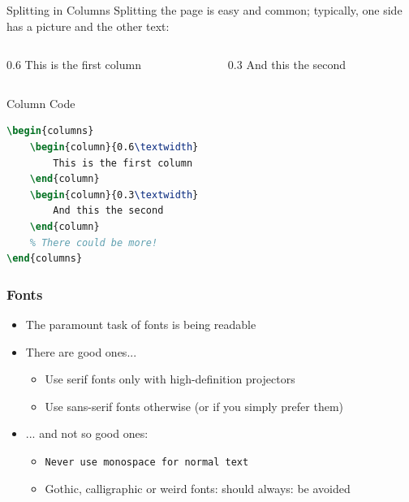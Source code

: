 \begin{frame}[fragile]{Splitting in Columns}
Splitting the page is easy and common;
typically, one side has a picture and the other text:
\begin{columns}
\begin{column}{0.6\textwidth}
This is the first column
\end{column}
\begin{column}{0.3\textwidth}
And this the second
\end{column}
\end{columns}
\begin{block}{Column Code}
\begin{lstlisting}[language=TeX]
\begin{columns}
    \begin{column}{0.6\textwidth}
        This is the first column
    \end{column}
    \begin{column}{0.3\textwidth}
        And this the second
    \end{column}
    % There could be more!
\end{columns}
\end{lstlisting}
\end{block}
\end{frame}

\begin{frame}[fragile]
\frametitle{Fonts}
\begin{itemize}
\item The paramount task of fonts is being readable
\item There are good ones...
  \begin{itemize}
  \item {\textrm{Use serif fonts only with high-definition projectors}}
  \item {\textsf{Use sans-serif fonts otherwise (or if you simply prefer them)}}
  \end{itemize}
\item ... and not so good ones:
  \begin{itemize}
  \item {\texttt{Never use monospace for normal text}}
  \item {\frakfamily Gothic, calligraphic or weird fonts: should always: be
  avoided}
\end{itemize}
\end{itemize}
\end{frame}

